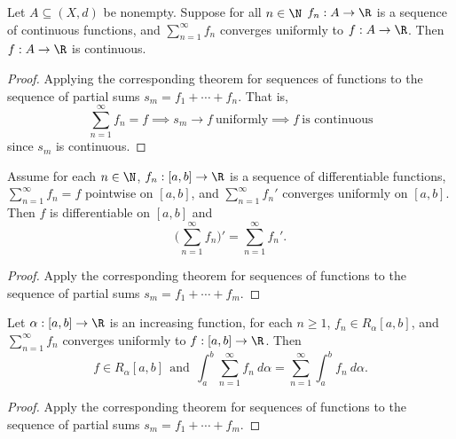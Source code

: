 \begin{theorem}\label{Term-by-Term Continuity Theorem}
Let \( A \subseteq  (X,d)  \) be nonempty. Suppose for all \( n \in \N \) \( {f}_{n} : A \to \R  \) is a sequence of continuous functions, and \( \sum_{ n=1  }^{ \infty  } {f}_{n} \) converges uniformly to \( f: A \to \R  \). Then \( f: A \to \R  \) is continuous.    
\end{theorem}
\begin{proof}
Applying the corresponding theorem for sequences of functions to the sequence of partial sums \( {s}_{m} = {f}_{1} + \cdots + {f}_{n} \). That is, 
\[  \sum_{ n=1  }^{ \infty  } {f}_{n} = f \implies {s}_{m} \to f \ \text{uniformly} \implies f \ \text{is continuous} \]
since \( {s}_{m}  \) is continuous.
\end{proof}

\begin{theorem}\label{Term-by-Term Differentiability Theorem}
    Assume for each \( n \in \N  \), \( {f}_{n} : [a,b] \to \R  \) is a sequence of differentiable functions, \( \sum_{ n=1  }^{ \infty  } {f}_{n} = f  \) pointwise on \( [a,b] \), and \( \sum_{ n=1  }^{ \infty  } {f}_{n}'  \) converges uniformly on \( [a,b] \). Then
    \( f  \) is differentiable on \( [a,b] \) and 
    \[  \Big(  \sum_{ n=1  }^{ \infty  } {f}_{n} \Big)' = \sum_{ n=1  }^{ \infty  } {f}_{n}'. \]
\end{theorem}
\begin{proof}
Apply the corresponding theorem for sequences of functions to the sequence of partial sums \( {s}_{m} = {f}_{1} + \cdots + {f}_{m} \).
\end{proof}

\begin{theorem}\label{Term-by-Term Integrability}
    Let \( \alpha: [a,b] \to \R  \) is an increasing function, for each \( n \geq 1  \), \( {f}_{n} \in {R}_{\alpha}[a,b] \), and \( \sum_{ n=1  }^{ \infty  } {f}_{n} \) converges uniformly to \( f: [a,b] \to \R   \). Then 
    \[  f \in {R}_{\alpha}[a,b] \ \ \text{and} \ \ \int_{ a }^{ b }  \sum_{ n=1  }^{ \infty  } {f}_{n} \ d \alpha = \sum_{ n=1  }^{ \infty  } \int_{ a }^{ b }  {f}_{n} \ d \alpha. \]
\end{theorem}
\begin{proof}
Apply the corresponding theorem for sequences of functions to the sequence of partial sums \( {s}_{m} = {f}_{1} + \cdots + {f}_{m} \).
\end{proof}

